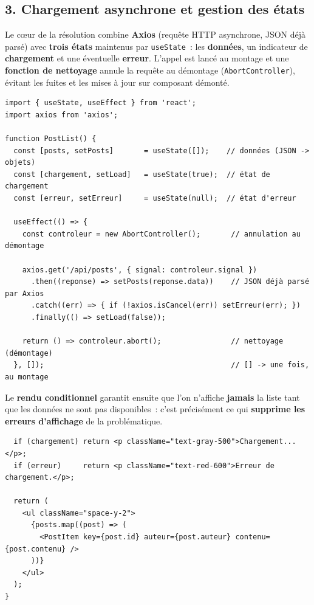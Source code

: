 \newpage

\subsection*{3. Chargement asynchrone et gestion des états}
{}
\noindent Le c\oe ur de la résolution combine \textbf{Axios} (requête HTTP asynchrone, JSON déjà parsé) avec \textbf{trois états} maintenus par \texttt{useState}~: les \textbf{données}, un indicateur de \textbf{chargement} et une éventuelle \textbf{erreur}. L'appel est lancé au montage et une \textbf{fonction de nettoyage} annule la requête au démontage (\texttt{AbortController}), évitant les fuites et les mises à jour sur composant démonté.

\begin{verbatim}
import { useState, useEffect } from 'react';
import axios from 'axios';

function PostList() {
  const [posts, setPosts]       = useState([]);    // données (JSON -> objets)
  const [chargement, setLoad]   = useState(true);  // état de chargement
  const [erreur, setErreur]     = useState(null);  // état d'erreur

  useEffect(() => {
    const controleur = new AbortController();       // annulation au démontage

    axios.get('/api/posts', { signal: controleur.signal })
      .then((reponse) => setPosts(reponse.data))    // JSON déjà parsé par Axios
      .catch((err) => { if (!axios.isCancel(err)) setErreur(err); })
      .finally(() => setLoad(false));

    return () => controleur.abort();                // nettoyage (démontage)
  }, []);                                           // [] -> une fois, au montage
\end{verbatim}

\noindent Le \textbf{rendu conditionnel} garantit ensuite que l'on n'affiche \textbf{jamais} la liste tant que les données ne sont pas disponibles~: c'est précisément ce qui \textbf{supprime les erreurs d'affichage} de la problématique.

\begin{verbatim}
  if (chargement) return <p className="text-gray-500">Chargement...</p>;
  if (erreur)     return <p className="text-red-600">Erreur de chargement.</p>;

  return (
    <ul className="space-y-2">
      {posts.map((post) => (
        <PostItem key={post.id} auteur={post.auteur} contenu={post.contenu} />
      ))}
    </ul>
  );
}
\end{verbatim}

